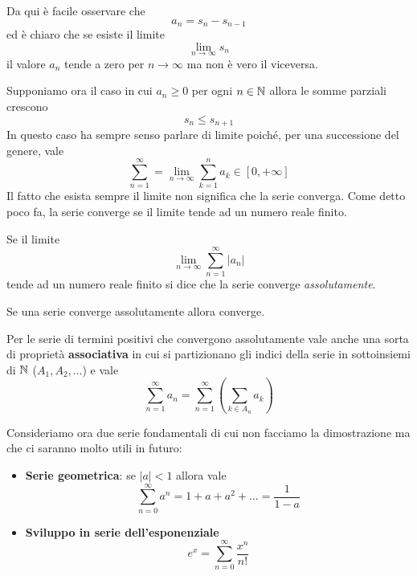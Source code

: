 \begin{observation}
	Da qui è facile osservare che
	\[ a_n = s_n - s_{n-1} \]
	ed è chiaro che se esiste il limite
	\[ \lim_{n \to \infty} s_n \]
	il valore $a_n$ tende a zero per $n \to \infty$ ma non è vero il viceversa.
\end{observation}

Supponiamo ora il caso in cui $a_n \geq 0$ per ogni $n \in \mathbb{N}$ allora le somme parziali crescono
\[ s_n \leq s_{n+1} \]
In questo caso ha sempre senso parlare di limite poiché, per una successione del genere, vale
\[ \sum_{n=1}^\infty = \lim_{n \to \infty} \sum_{k=1}^n a_k \in [0, +\infty]  \]
Il fatto che esista sempre il limite non significa che la serie converga. Come detto poco fa, la
serie converge se il limite tende ad un numero reale finito.

\begin{definition}
	Se il limite
	\[ \lim_{n \to \infty} \sum_{n=1}^\infty |a_n| \]
	tende ad un numero reale finito si dice che la serie converge \emph{assolutamente}.
\end{definition}

\begin{theorem}
	Se una serie converge assolutamente allora converge.
\end{theorem}

Per le serie di termini positivi che convergono assolutamente vale anche una sorta di proprietà
\textbf{associativa} in cui si partizionano gli indici della serie in sottoinsiemi di $\mathbb{N}$
($A_1, A_2, \dots$) e vale
\[ \sum_{n=1}^\infty a_n = \sum_{n=1}^\infty \left( \sum_{k \in A_n} a_k \right) \]

Consideriamo ora due serie fondamentali di cui non facciamo la dimostrazione ma che ci saranno
molto utili in futuro:
\begin{itemize}
	\item \textbf{Serie geometrica}: se $|a| < 1$ allora vale
	      \[ \sum_{n=0}^\infty a^n = 1 + a + a^2 + \dots = \frac{1}{1 - a} \]
	\item \textbf{Sviluppo in serie dell'esponenziale}
	      \[ e^x = \sum_{n=0}^\infty \frac{x^n}{n!} \]
\end{itemize}
